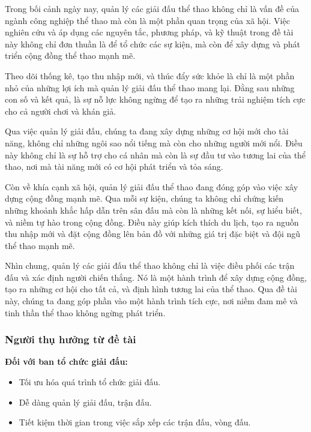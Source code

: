 Trong bối cảnh ngày nay, quản lý các giải đấu thể thao không chỉ là vấn đề của ngành công nghiệp thể thao mà còn là một phần quan trọng của xã hội. Việc nghiên cứu và áp dụng các nguyên tắc, phương pháp, và kỹ thuật trong đề tài này không chỉ đơn thuần là để tổ chức các sự kiện, mà còn để xây dựng và phát triển cộng đồng thể thao mạnh mẽ.
\par
Theo dõi thống kê, tạo thu nhập mới, và thúc đẩy sức khỏe là chỉ là một phần nhỏ của những lợi ích mà quản lý giải đấu thể thao mang lại. Đằng sau những con số và kết quả, là sự nỗ lực không ngừng để tạo ra những trải nghiệm tích cực cho cả người chơi và khán giả.
\par
Qua việc quản lý giải đấu, chúng ta đang xây dựng những cơ hội mới cho tài năng, không chỉ những ngôi sao nổi tiếng mà còn cho những người mới nổi. Điều này không chỉ là sự hỗ trợ cho cá nhân mà còn là sự đầu tư vào tương lai của thể thao, nơi mà tài năng mới có cơ hội phát triển và tỏa sáng.
\par
Còn về khía cạnh xã hội, quản lý giải đấu thể thao đang đóng góp vào việc xây dựng cộng đồng mạnh mẽ. Qua mỗi sự kiện, chúng ta không chỉ chứng kiến những khoảnh khắc hấp dẫn trên sân đấu mà còn là những kết nối, sự hiểu biết, và niềm tự hào trong cộng đồng. Điều này giúp kích thích du lịch, tạo ra nguồn thu nhập mới và đặt cộng đồng lên bản đồ với những giá trị đặc biệt và đội ngũ thể thao mạnh mẽ.
\par
Nhìn chung, quản lý các giải đấu thể thao không chỉ là việc điều phối các trận đấu và xác định người chiến thắng. Nó là một hành trình để xây dựng cộng đồng, tạo ra những cơ hội cho tất cả, và định hình tương lai của thể thao. Qua đề tài này, chúng ta đang góp phần vào một hành trình tích cực, nơi niềm đam mê và tinh thần thể thao không ngừng phát triển.


\subsubsection{Người thụ hưởng từ đề tài}


\textbf{Đối với ban tổ chức giải đấu:}
\begin{itemize}[itemindent=1cm, label={--}]
  \item Tối ưu hóa quá trình tổ chức giải đấu.
  \item Dễ dàng quản lý giải đấu, trận đấu.
  \item Tiết kiệm thời gian trong việc sắp xếp các trận đấu, vòng đấu.

\end{itemize}

